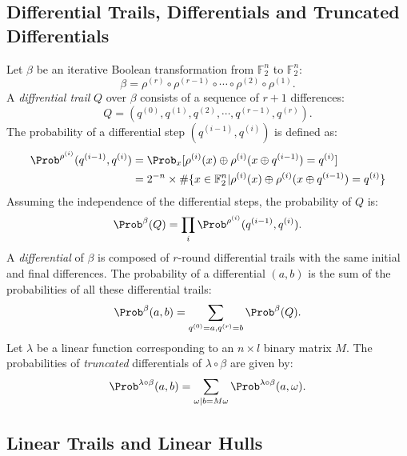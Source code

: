 \subsection{Differential Trails, Differentials and Truncated Differentials \cite{DR02}}

Let $\beta$ be an iterative Boolean transformation from $\mathbb{F}_2^n$ to $\mathbb{F}_2^n$: 
\[
    \beta=\rho^{(r)}\circ\rho^{(r-1)}\circ\cdots\circ\rho^{(2)}\circ\rho^{(1)}.
\]
A \textit{diffrential trail} $Q$ over $\beta$ consists of a sequence of $r+1$ differences:
\[
    Q=(q^{(0)},q^{(1)},q^{(2)},\cdots,q^{(r-1)},q^{(r)}).
\]
The probability of a differential step $(q^{(i-1)},q^{(i)})$ is defined as:
\begin{align*}
    \Prob^{\rho^{(i)}}(q^{(i-1)},q^{(i)})&=\Prob_x[\rho^{(i)}(x)\oplus\rho^{(i)}(x\oplus q^{(i-1)})=q^{(i)}]\\
    &=2^{-n}\times\#\{x\in \mathbb{F}_2^n|\rho^{(i)}(x)\oplus\rho^{(i)}(x\oplus q^{(i-1)})=q^{(i)}\}
\end{align*}
Assuming the independence of the differential steps, the probability of $Q$ is:
\[
    \Prob^{\beta}(Q)=\prod\limits_i\Prob^{\rho^{(i)}}(q^{(i-1)},q^{(i)}).
\]
A \textit{differential} of $\beta$ is composed of $r$-round differential trails with the same initial and final differences. The probability of a differential $(a,b)$ is the sum of the probabilities of all these differential trails:
\[
    \Prob^{\beta}(a,b)=\sum\limits_{q^{(0)}=a,q^{(r)}=b}\Prob^{\beta}(Q).
\]
Let $\lambda$ be a linear function corresponding to an $n\times l$ binary matrix $M$. The probabilities of \textit{truncated} differentials of $\lambda\circ\beta$ are given by:
\[
    \Prob^{\lambda\circ\beta}(a,b)=\sum\limits_{\omega|b=M\omega}\Prob^{\lambda\circ\beta}(a,\omega).
\]

\subsection{Linear Trails and Linear Hulls \cite{DR02}}

